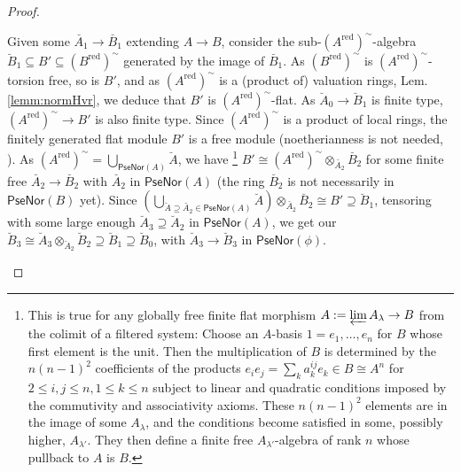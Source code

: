 \documentclass[10pt]{amsart}
\theoremstyle{definition}
\newcommand{\PN}{\mathsf{PseNor}}
\newcommand{\red}{{\operatorname{red}}}
\begin{document}
\begin{proof}
\begin{enumerate}
Given some $\breve{A_1} \to \breve{B_1}$ extending $A \to B$, consider the sub-$(A^\red)^\sim$-algebra $\breve{B}_1 \subseteq B' \subseteq (B^\red)^\sim$ generated by the image of $\breve{B_1}$. As $(B^\red)^\sim$ is $(A^\red)^\sim$-torsion free, so is $B'$, and as $(A^\red)^\sim$ is a (product of) valuation rings, Lem.\ref{lemm:normHvr}, we deduce that $B'$ is $(A^\red)^\sim$-flat. As $\breve{A}_0 \to \breve{B}_1$ is finite type, $(A^\red)^\sim \to B'$ is also finite type. Since $(A^\red)^\sim$ is a product of local rings, the finitely generated flat module $B'$ is a free module (noetherianness is not needed, \cite[Thm.7.10]{Mat89}). As $(A^\red)^\sim = \bigcup_{\PN(A)} \breve{A}$, we have%
\footnote{\label{foot:descff} This is true for any globally free finite flat morphism $A := \varprojlim A_\lambda \to B$ from the colimit of a filtered system: Choose an $A$-basis $1 = e_1, \dots, e_n$ for $B$ whose first element is the unit. Then the multiplication of $B$ is determined by the $n(n-1)^2$ coefficients of the products $e_ie_j = \sum_k a^{ij}_k e_k \in B \cong A^n$ for $2 \leq i, j \leq n, 1 \leq k \leq n$ subject to linear and quadratic conditions imposed by the commutivity and associativity axioms. These $n(n-1)^2$ elements are in the image of some $A_\lambda$, and the conditions become satisfied in some, possibly higher, $A_{\lambda'}$. They then define a finite free $A_{\lambda'}$-algebra of rank $n$ whose pullback to $A$ is $B$.
} %
 $B' \cong (A^\red)^\sim \otimes_{\breve{A_2}} \breve{B_2}$ for some finite free $\breve{A_2} \to \breve{B_2}$ with $\breve{A_2}$ in $\PN(A)$ (the ring $\breve{B_2}$ is not necessarily in $\PN(B)$ yet). Since $(\bigcup_{\breve{A} \supseteq \breve{A_2} \in \PN(A)} \breve{A}) \otimes_{\breve{A_2}} \breve{B_2} \cong B' \supseteq \breve{B}_1$, tensoring with some large enough $\breve{A}_3 \supseteq \breve{A}_2$ in $\PN(A)$, we get our $\breve{B}_3 \cong \breve{A}_3 \otimes_{\breve{A}_2} \breve{B}_2 \supseteq \breve{B}_1 \supseteq \breve{B}_0$, with $\breve{A}_3 \to \breve{B}_3$ in $\PN(\phi)$. %
\end{enumerate}
\end{proof}
\end{document}
